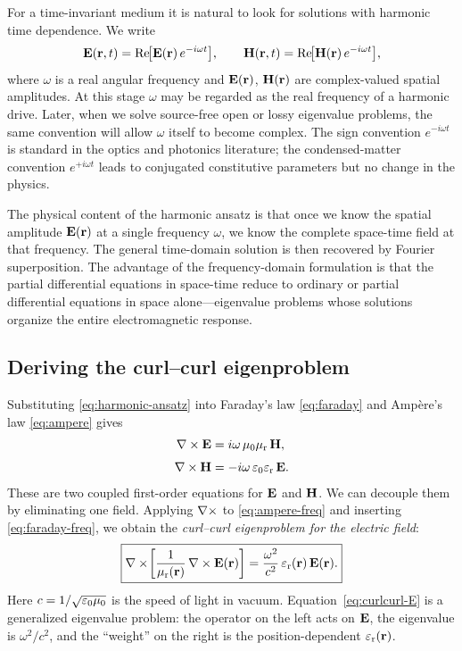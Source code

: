 For a time-invariant medium it is natural to look for solutions with
harmonic time dependence. We write
\begin{equation}
 \mathbf{E}(\mathbf{r},t) = \operatorname{Re}\!\bigl[\mathbf{E}(\mathbf{r})\,e^{-i\omega t}\bigr],
 \qquad
 \mathbf{H}(\mathbf{r},t) = \operatorname{Re}\!\bigl[\mathbf{H}(\mathbf{r})\,e^{-i\omega t}\bigr],
 \label{eq:harmonic-ansatz}
\end{equation}
where $\omega$ is a real angular frequency and $\mathbf{E}(\mathbf{r})$, $\mathbf{H}(\mathbf{r})$ are
complex-valued spatial amplitudes. At this stage $\omega$ may be regarded
as the real frequency of a harmonic drive. Later, when we solve source-free
open or lossy eigenvalue problems, the same convention will allow
$\omega$ itself to become complex. The sign convention $e^{-i\omega t}$
is standard in the optics and photonics literature; the condensed-matter
convention $e^{+i\omega t}$ leads to conjugated constitutive parameters but
no change in the physics.

The physical content of the harmonic ansatz is that once we know the spatial
amplitude $\mathbf{E}(\mathbf{r})$ at a single frequency $\omega$, we know the complete
space-time field at that frequency. The general time-domain solution is then
recovered by Fourier superposition. The advantage of the frequency-domain
formulation is that the partial differential equations in space-time reduce
to ordinary or partial differential equations in space alone---eigenvalue
problems whose solutions organize the entire electromagnetic response.

\subsection{Deriving the curl--curl eigenproblem}
\label{ssec:curlcurl-derive}

Substituting \eqref{eq:harmonic-ansatz} into Faraday's law
\eqref{eq:faraday} and Amp\`ere's law \eqref{eq:ampere} gives
\begin{align}
 \nabla\times \mathbf{E} &= i\omega\,\mu_0\mu_{\mathrm{r}}\,\mathbf{H}, \label{eq:faraday-freq}\\[3pt]
 \nabla\times \mathbf{H} &= -i\omega\,\varepsilon_0\varepsilon_{\mathrm{r}}\,\mathbf{E}. \label{eq:ampere-freq}
\end{align}
These are two coupled first-order equations for $\mathbf{E}$ and $\mathbf{H}$. We can
decouple them by eliminating one field. Applying $\nabla\times$ to
\eqref{eq:ampere-freq} and inserting \eqref{eq:faraday-freq}, we obtain
the \emph{curl--curl eigenproblem for the electric field}:
\begin{equation}
 \boxed{
 \nabla\times\!\left[\frac{1}{\mu_{\mathrm{r}}(\mathbf{r})}\,\nabla\times\mathbf{E}(\mathbf{r})\right]
 = \frac{\omega^2}{c^2}\,\varepsilon_{\mathrm{r}}(\mathbf{r})\,\mathbf{E}(\mathbf{r}).
 }
 \label{eq:curlcurl-E}
\end{equation}
Here $c = 1/\sqrt{\varepsilon_0\mu_0}$ is the speed of light in vacuum.
Equation~\eqref{eq:curlcurl-E} is a generalized eigenvalue problem:
the operator on the left acts on $\mathbf{E}$, the eigenvalue is
$\omega^2/c^2$, and the ``weight'' on the right is the
position-dependent $\varepsilon_{\mathrm{r}}(\mathbf{r})$.

